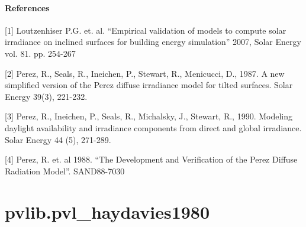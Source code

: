 \documentclass[letterpaper,10pt,english]{sphinxmanual}
\begin{document}
\begin{fulllineitems}
\paragraph{References}

{[}1{]} Loutzenhiser P.G. et. al. ``Empirical validation of models to compute
solar irradiance on inclined surfaces for building energy simulation''
2007, Solar Energy vol. 81. pp. 254-267

{[}2{]} Perez, R., Seals, R., Ineichen, P., Stewart, R., Menicucci, D., 1987. A new
simplified version of the Perez diffuse irradiance model for tilted
surfaces. Solar Energy 39(3), 221-232.

{[}3{]} Perez, R., Ineichen, P., Seals, R., Michalsky, J., Stewart, R., 1990.
Modeling daylight availability and irradiance components from direct
and global irradiance. Solar Energy 44 (5), 271-289.

{[}4{]} Perez, R. et. al 1988. ``The Development and Verification of the
Perez Diffuse Radiation Model''. SAND88-7030

\end{fulllineitems}



\section{pvlib.pvl\_haydavies1980}
\label{stubs/pvlib.pvl_haydavies1980:pvlib-pvl-haydavies1980}\label{stubs/pvlib.pvl_haydavies1980::doc}
\end{document}
